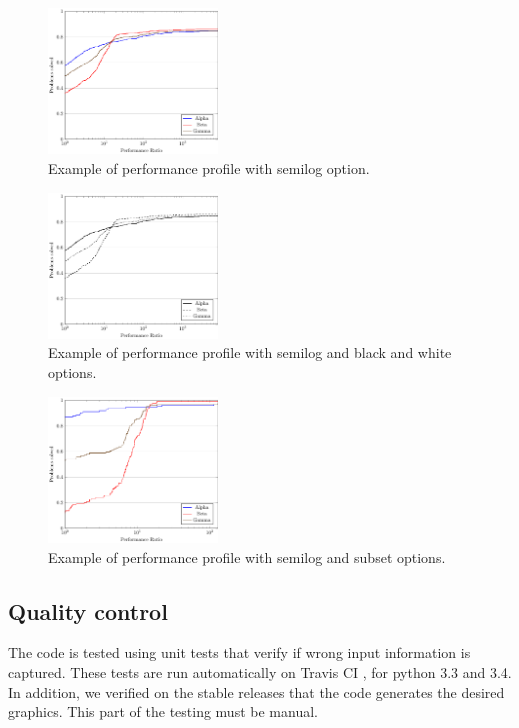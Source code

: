     \begin{figure}[!ht]
      \centering
      \includegraphics[width=0.4\textwidth]{plots/abc-semilog.pdf}
      \caption{Example of performance profile with semilog option.}
      \label{fig:example2}
    \end{figure}
    \begin{figure}[!ht]
      \centering
      \includegraphics[width=0.4\textwidth]{plots/abc-semilog-bw.pdf}
      \caption{Example of performance profile with semilog and black and white
        options.}
      \label{fig:example3}
    \end{figure}
    \begin{figure}[!ht]
      \centering
      \includegraphics[width=0.4\textwidth]{plots/abc-semilog-hs.pdf}
      \caption{Example of performance profile with semilog and subset options.}
      \label{fig:example4}
    \end{figure}

\subsection*{Quality control}

    The code is tested using unit tests that verify if wrong input information
    is captured. These tests are run automatically on Travis CI
    \cite{url:travis}, for python 3.3 and 3.4.
    In addition, we verified on the stable releases that the code generates the
    desired graphics. This part of the testing must be manual.

